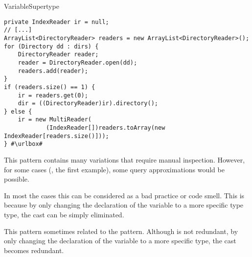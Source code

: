 \begin{pattern}{VariableSupertype}
\begin{verbatim}
private IndexReader ir = null;  
// [...]
ArrayList<DirectoryReader> readers = new ArrayList<DirectoryReader>();
for (Directory dd : dirs) {
    DirectoryReader reader;        
    reader = DirectoryReader.open(dd);
    readers.add(reader);
}
if (readers.size() == 1) {
    ir = readers.get(0);
    dir = ((DirectoryReader)ir).directory();
} else {
    ir = new MultiReader(
            (IndexReader[])readers.toArray(new IndexReader[readers.size()]));
} #\urlbox#
\end{verbatim}


\detection{}
This pattern contains many variations that require manual inspection.
However, for some cases (\eg{}, the first example),
some query approximations would be possible.

\issues{}
In most the cases this can be considered as a bad practice or code smell.
This is because by only changing the declaration of the variable
to a more specific type type, the cast can be simply eliminated.

This pattern sometimes related to the  pattern.
Although \thisp{} is not redundant,
by only changing the declaration of the variable to a more specific type,
the cast becomes redundant.

\end{pattern}
